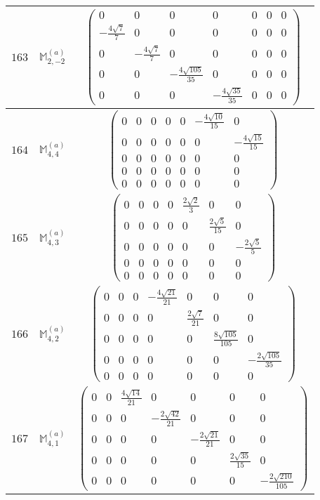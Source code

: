 \documentclass[fleqn,8pt,landscape]{jsarticle}
\begin{document}
\begin{center}
\begin{longtable}{ccc}
$ 163 $ & $ \mathbb{M}_{2,-2}^{(a)} $ & $ \begin{pmatrix} 0 & 0 & 0 & 0 & 0 & 0 & 0 \\ - \frac{4 \sqrt{7}}{7} & 0 & 0 & 0 & 0 & 0 & 0 \\ 0 & - \frac{4 \sqrt{7}}{7} & 0 & 0 & 0 & 0 & 0 \\ 0 & 0 & - \frac{4 \sqrt{105}}{35} & 0 & 0 & 0 & 0 \\ 0 & 0 & 0 & - \frac{4 \sqrt{35}}{35} & 0 & 0 & 0 \end{pmatrix} $ \\ \hline
$ 164 $ & $ \mathbb{M}_{4,4}^{(a)} $ & $ \begin{pmatrix} 0 & 0 & 0 & 0 & 0 & - \frac{4 \sqrt{10}}{15} & 0 \\ 0 & 0 & 0 & 0 & 0 & 0 & - \frac{4 \sqrt{15}}{15} \\ 0 & 0 & 0 & 0 & 0 & 0 & 0 \\ 0 & 0 & 0 & 0 & 0 & 0 & 0 \\ 0 & 0 & 0 & 0 & 0 & 0 & 0 \end{pmatrix} $ \\ \hline
$ 165 $ & $ \mathbb{M}_{4,3}^{(a)} $ & $ \begin{pmatrix} 0 & 0 & 0 & 0 & \frac{2 \sqrt{2}}{3} & 0 & 0 \\ 0 & 0 & 0 & 0 & 0 & \frac{2 \sqrt{5}}{15} & 0 \\ 0 & 0 & 0 & 0 & 0 & 0 & - \frac{2 \sqrt{5}}{5} \\ 0 & 0 & 0 & 0 & 0 & 0 & 0 \\ 0 & 0 & 0 & 0 & 0 & 0 & 0 \end{pmatrix} $ \\ \hline
$ 166 $ & $ \mathbb{M}_{4,2}^{(a)} $ & $ \begin{pmatrix} 0 & 0 & 0 & - \frac{4 \sqrt{21}}{21} & 0 & 0 & 0 \\ 0 & 0 & 0 & 0 & \frac{2 \sqrt{7}}{21} & 0 & 0 \\ 0 & 0 & 0 & 0 & 0 & \frac{8 \sqrt{105}}{105} & 0 \\ 0 & 0 & 0 & 0 & 0 & 0 & - \frac{2 \sqrt{105}}{35} \\ 0 & 0 & 0 & 0 & 0 & 0 & 0 \end{pmatrix} $ \\ \hline
$ 167 $ & $ \mathbb{M}_{4,1}^{(a)} $ & $ \begin{pmatrix} 0 & 0 & \frac{4 \sqrt{14}}{21} & 0 & 0 & 0 & 0 \\ 0 & 0 & 0 & - \frac{2 \sqrt{42}}{21} & 0 & 0 & 0 \\ 0 & 0 & 0 & 0 & - \frac{2 \sqrt{21}}{21} & 0 & 0 \\ 0 & 0 & 0 & 0 & 0 & \frac{2 \sqrt{35}}{15} & 0 \\ 0 & 0 & 0 & 0 & 0 & 0 & - \frac{2 \sqrt{210}}{105} \end{pmatrix} $ \\ \hline

\end{longtable}
\end{center}
\end{document}
